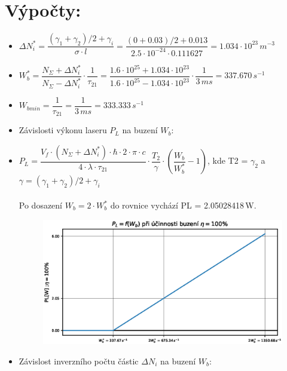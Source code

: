 \documentclass[10pt, a4paper]{article}%
\begin{document}
\section*{\Large Výpočty:}
\begin{itemize}
    \item $\Delta N_i^* = \dfrac{(\gamma_1 + \gamma_2)/2+\gamma_i}{\sigma \cdot l} = \dfrac{(0 + 0.03)/2+0.013}{2.5\cdot10^{-24} \cdot 0.111627}
    = 1.034\cdot 10^{23}\,m^{-3}$
    \item $W_b^* = \dfrac{N_\Sigma + \Delta N_i^*}{N_\Sigma - \Delta N_i^*}\cdot \dfrac{1}{\tau_{21}} =
    \dfrac{1.6\cdot 10^{25} + 1.034\cdot 10^{23}}{1.6\cdot 10^{25} - 1.034\cdot 10^{23}}\cdot \dfrac{1}{3\,ms} =337.670\,s^{-1} $
    \item $W_{bmin} = \dfrac{1}{\tau_{21}} = \dfrac{1}{3\,ms} = 333.333\,s^{-1}$
    \clearpage
    \item Závislosti výkonu laseru $P_L$ na buzení $W_b$:
    \item $P_L = \dfrac{V_f\cdot (N_\Sigma +\Delta N_i^*)\cdot \hbar \cdot 2 \cdot \pi \cdot c}{4\cdot \lambda \cdot \tau_{21}}
    \cdot \dfrac{T_2}{\gamma}\cdot\left(\dfrac{W_b}{W_b^*}-1\right)$, kde T2 = $\gamma_2$ a $\gamma = (\gamma_1 + \gamma_2)/2+\gamma_i$\\\\
    Po dosazení $W_b = 2\cdot W_b^*$ do rovnice vychází PL = 2.05028418\,W.
    
    \begin{figure}[ht!]
        \centering
        \includegraphics[width=1\textwidth]{graphs.eps}
    \end{figure}
    \item Závislost inverzního počtu částic $\Delta N_i$ na buzení $W_b$:


\end{itemize}
\end{document}
